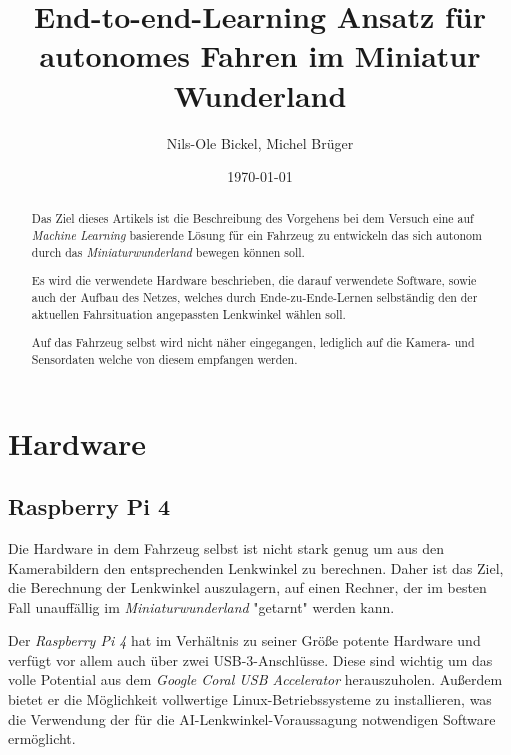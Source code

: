 \documentclass[a4paper, 12pt]{scrartcl}
\title{End-to-end-Learning Ansatz für autonomes Fahren im Miniatur Wunderland}
\author{Nils-Ole Bickel, Michel Brüger}
\date{\today}
\begin{document}
	
\maketitle

\begin{abstract}
Das Ziel dieses Artikels ist die Beschreibung des Vorgehens bei dem Versuch eine auf \emph{Machine Learning} basierende Lösung für ein Fahrzeug zu entwickeln das sich autonom durch das \emph{Miniaturwunderland} bewegen können soll.

Es wird die verwendete Hardware beschrieben, die darauf verwendete Software, sowie auch der Aufbau des Netzes, welches durch Ende-zu-Ende-Lernen selbständig den der aktuellen Fahrsituation angepassten Lenkwinkel wählen soll.

Auf das Fahrzeug selbst wird nicht näher eingegangen, lediglich auf die Kamera- und Sensordaten welche von diesem empfangen werden.
	
\end{abstract}

\newpage	

\tableofcontents

\newpage
	


	\section{Hardware}
		\subsection{Raspberry Pi 4}
		Die Hardware in dem Fahrzeug selbst ist nicht stark genug um aus den Kamerabildern den entsprechenden Lenkwinkel zu berechnen. Daher ist das Ziel, die Berechnung der Lenkwinkel auszulagern, auf einen Rechner, der im besten Fall unauffällig im \emph{Miniaturwunderland} "getarnt" werden kann. 
		
		Der \emph{Raspberry Pi 4} hat im Verhältnis zu seiner Größe potente Hardware und verfügt vor allem auch über zwei USB-3-Anschlüsse. Diese sind wichtig um das volle Potential aus dem \emph{Google Coral USB Accelerator} herauszuholen. Außerdem bietet er die Möglichkeit vollwertige Linux-Betriebssysteme zu installieren, was die Verwendung der für die AI-Lenkwinkel-Voraussagung notwendigen Software ermöglicht.
		
\end{document}
